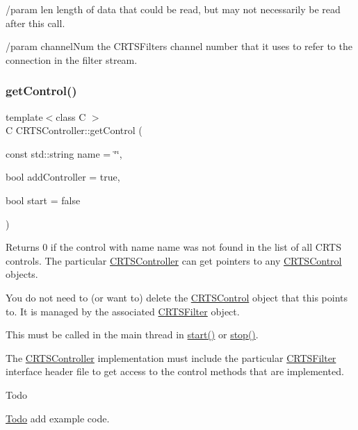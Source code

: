 /param len length of data that could be read, but may not necessarily be read after this call.

/param channel\+Num the C\+R\+T\+S\+Filters channel number that it uses to refer to the connection in the filter stream. \mbox{\label{classCRTSController_aa2b26a62c62fe5758ab5cc9104e96b56}} 
\subsubsection{\texorpdfstring{get\+Control()}{getControl()}}
{\footnotesize\ttfamily template$<$class C $>$ \\
C C\+R\+T\+S\+Controller\+::get\+Control (\begin{DoxyParamCaption}\item[{const std\+::string}]{name = {\ttfamily \char`\"{}\char`\"{}},  }\item[{bool}]{add\+Controller = {\ttfamily true},  }\item[{bool}]{start = {\ttfamily false} }\end{DoxyParamCaption})\hspace{0.3cm}{\ttfamily [protected]}}

Returns 0 if the control with name name was not found in the list of all C\+R\+TS controls. The particular \hyperlink{classCRTSController}{C\+R\+T\+S\+Controller} can get pointers to any \hyperlink{classCRTSControl}{C\+R\+T\+S\+Control} objects.

You do not need to (or want to) delete the \hyperlink{classCRTSControl}{C\+R\+T\+S\+Control} object that this points to. It is managed by the associated \hyperlink{classCRTSFilter}{C\+R\+T\+S\+Filter} object.

This must be called in the main thread in \hyperlink{classCRTSController_a9065844e7c7aac10e26dad339ee65a8c}{start()} or \hyperlink{classCRTSController_a883c09ddb21374753c3be0fc66f016fb}{stop()}.

The \hyperlink{classCRTSController}{C\+R\+T\+S\+Controller} implementation must include the particular \hyperlink{classCRTSFilter}{C\+R\+T\+S\+Filter} interface header file to get access to the control methods that are implemented.

\begin{DoxyRefDesc}{Todo}
\item[\hyperlink{todo__todo000002}{Todo}]add example code.\end{DoxyRefDesc}



